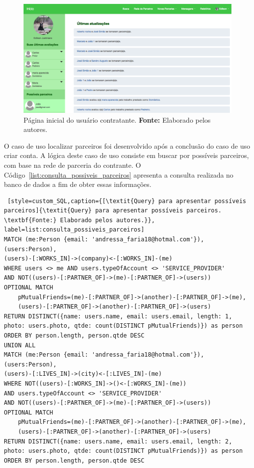 \newpage
\begin{figure}[h!]
	\centerline{\includegraphics[scale=0.3]{./imagens/home-contratante.png}}
	\caption[Página inicial do usuário contratante.]
	{Página inicial do usuário contratante. \textbf{Fonte:} Elaborado pelos autores.}
	\label{fig:pagina_inicial_contratante}
\end{figure}


\par O caso de uso localizar parceiros foi desenvolvido após a conclusão do caso de uso criar conta. A lógica deste caso de uso consiste em buscar por possíveis parceiros, com base na rede de parceria do contrante. O Código~\ref{list:consulta_possiveis_parceiros} apresenta a consulta realizada no banco de dados a fim de obter essas informações.

\begin{lstlisting} [style=custom_SQL,caption={[\textit{Query} para apresentar possíveis parceiros]{\textit{Query} para apresentar possíveis parceiros. \textbf{Fonte:} Elaborado pelos autores.}}, label=list:consulta_possiveis_parceiros] 	
MATCH (me:Person {email: 'andressa_faria18@hotmal.com'}), (users:Person),
(users)-[:WORKS_IN]->(company)<-[:WORKS_IN]-(me)
WHERE users <> me AND users.typeOfAccount <> 'SERVICE_PROVIDER'
AND NOT((users)-[:PARTNER_OF]->(me)-[:PARTNER_OF]->(users)) 
OPTIONAL MATCH
	pMutualFriends=(me)-[:PARTNER_OF]->(another)-[:PARTNER_OF]->(me),
	(users)-[:PARTNER_OF]->(another)-[:PARTNER_OF]->(users)
RETURN DISTINCT({name: users.name, email: users.email, length: 1, 
photo: users.photo, qtde: count(DISTINCT pMutualFriends)}) as person
ORDER BY person.length, person.qtde DESC
UNION ALL
MATCH (me:Person {email: 'andressa_faria18@hotmal.com'}), (users:Person),
(users)-[:LIVES_IN]->(city)<-[:LIVES_IN]-(me)
WHERE NOT((users)-[:WORKS_IN]->()<-[:WORKS_IN]-(me))
AND users.typeOfAccount <> 'SERVICE_PROVIDER'
AND NOT((users)-[:PARTNER_OF]->(me)-[:PARTNER_OF]->(users))
OPTIONAL MATCH 
	pMutualFriends=(me)-[:PARTNER_OF]->(another)-[:PARTNER_OF]->(me),
	(users)-[:PARTNER_OF]->(another)-[:PARTNER_OF]->(users)
RETURN DISTINCT({name: users.name, email: users.email, length: 2, 
photo: users.photo, qtde: count(DISTINCT pMutualFriends)}) as person
ORDER BY person.length, person.qtde DESC
\end{lstlisting}

